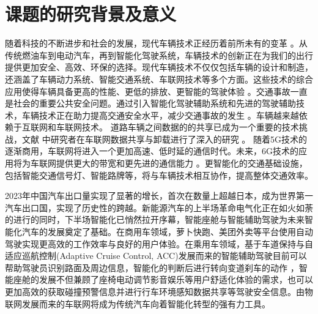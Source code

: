 \section{课题的研究背景及意义}\label{section1-1}

\textcolor[RGB]{202,12,22}{}
随着科技的不断进步和社会的发展，现代车辆技术正经历着前所未有的变革 \supercite{SystematicSurvey10225497,DeepReinforcement9146378}。从传统燃油车到电动汽车，再到智能化驾驶系统，车辆技术的创新正在为我们的出行提供更加安全、高效、环保的选择。现代车辆技术不仅仅包括车辆的设计和制造，还涵盖了车辆动力系统、智能交通系统、车联网技术等多个方面。这些技术的综合应用使得车辆具备更高的性能、更低的排放、更智能的驾驶体验 \supercite{Autonomous9351818}。交通事故一直是社会的重要公共安全问题。通过引入智能化驾驶辅助系统和先进的驾驶辅助技术，车辆技术正在助力提高交通安全水平，减少交通事故的发生 \supercite{SecurityandPrivacy}。车辆越来越依赖于互联网和车联网技术。
道路车辆之间数据的的共享已成为一个重要的技术挑战，文献 \cite{刘雪娇186}中研究者在车联网数据共享与卸载进行了深入的研究 。
随着5G技术的逐渐商用，车联网将进入一个更加高速、低时延的通信时代。未来，6G技术的应用将为车联网提供更大的带宽和更先进的通信能力 \supercite{6GforVehicle}。更智能化的交通基础设施，包括智能交通信号灯、智能路牌等，将与车辆技术相互协作，提高整体交通效率。

2023年中国汽车出口量实现了显著的增长，首次在数量上超越日本，成为世界第一汽车出口国，实现了历史性的跨越。新能源汽车的上半场革命电气化正在如火如荼的进行的同时，下半场智能化已悄然拉开序幕，智能座舱与智能辅助驾驶为未来智能化汽车的发展奠定了基础。在商用车领域，萝卜快跑、美团外卖等平台使用自动驾驶实现更高效的工作效率与良好的用户体验。在乘用车领域，基于车道保持与自适应巡航控制(Adaptive Cruise Control, ACC)发展而来的智能辅助驾驶目前可以帮助驾驶员识别路面及周边信息，智能化的判断后进行转向变道刹车的动作 \supercite{SurveyofDeep8951131}，智能座舱的发展不但兼顾了座椅电动调节影音娱乐等用户舒适化体验的需求，也可以更加高效的获取碰撞预警信息并进行行车环境感知数据共享等驾驶安全信息。由物联网发展而来的车联网将成为传统汽车向着智能化转型的强有力工具。

